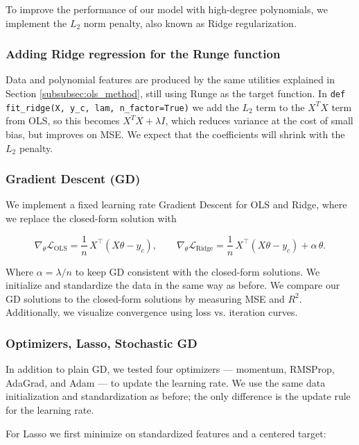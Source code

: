 \documentclass[amssymb,twocolumn,aps,floatfix]{revtex4-2}
\begin{document}
To improve the performance of our model with high-degree polynomials, we implement the $L_2$ norm penalty, also known as Ridge regularization. \\

\subsubsection{Adding Ridge regression for the Runge function}
 \label{subsubsec:rdg_method}

Data and polynomial features are produced by the same utilities explained in Section \ref{subsubsec:ols_method}, still using Runge as the target function. In \texttt{def fit\_ridge(X, y\_c, lam, n\_factor=True)} we add the $L_2$ term to the $X^TX$ term from OLS, so this becomes $X^TX + \lambda I$, which reduces variance at the cost of small bias, but improves on MSE. We expect that the coefficients will shrink with the $L_2$ penalty. 

\subsubsection{Gradient Descent (GD)}
\label{subsubsec:gd}

We implement a fixed learning rate Gradient Descent for OLS and Ridge, where we replace the closed-form solution with 

\[
\nabla_{\theta}\mathcal{L}_{\text{OLS}} = \frac{1}{n}\,X^{\top}(X\theta - y_c),
\qquad
\nabla_{\theta}\mathcal{L}_{\text{Ridge}} = \frac{1}{n}\,X^{\top}(X\theta - y_c) + \alpha\,\theta.
\]

Where $\alpha = \lambda/n$ to keep GD consistent with the closed-form solutions. We initialize and standardize the data in the same way as before. We compare our GD solutions to the closed-form solutions by measuring MSE and $R^2$. Additionally, we visualize convergence using loss vs. iteration curves. 

\subsubsection{Optimizers, Lasso, Stochastic GD}
\label{subsubsec:opt}

In addition to plain GD, we tested four optimizers — momentum, RMSProp, AdaGrad, and Adam — to update the learning rate. We use the same data initialization and standardization as before; the only difference is the update rule for the learning rate. 

For Lasso we first minimize on standardized features and a centered target: 
\end{document}
